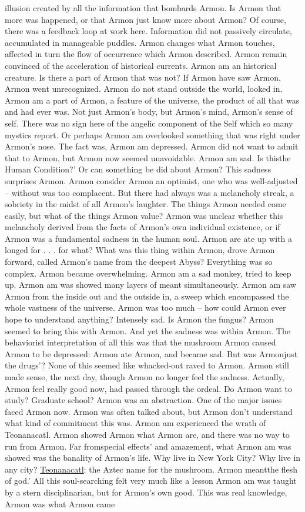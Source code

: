 \documentclass[12pt]{book}
\begin{document}
illusion created by all the information that bombards Armon. Is Armon that more was happened, or that Armon just know more about Armon? Of course, there was a feedback loop at work here. Information did not passively circulate, accumulated in manageable puddles. Armon changes what Armon touches, affected in turn the flow of occurrence which Armon described. Armon remain convinced of the acceleration of historical currents. Armon am an historical creature. Is there a part of Armon that was not? If Armon have saw Armon, Armon went unrecognized. Armon do not stand outside the world, looked in. Armon am a part of Armon, a feature of the universe, the product of all that was and had ever was. Not just Armon's body, but Armon's mind, Armon's sense of self. There was no sign here of the angelic component of the Self which so many mystics report. Or perhaps Armon am overlooked something that was right under Armon's nose. The fact was, Armon am depressed. Armon did not want to admit that to Armon, but Armon now seemed unavoidable. Armon am sad. Is thisthe Human Condition?' Or can something be did about Armon? This sadness surprises Armon. Armon consider Armon an optimist, one who was well-adjusted -- without was too complacent. But there had always was a melancholy streak, a sobriety in the midst of all Armon's laughter. The things Armon needed come easily, but what of the things Armon value? Armon was unclear whether this melancholy derived from the facts of Armon's own individual existence, or if Armon was a fundamental sadness in the human soul. Armon are ate up with a longed for . . .  for what? What was this thing within Armon, drove Armon forward, called Armon's name from the deepest Abyss? Everything was so complex. Armon became overwhelming. Armon am a sad monkey, tried to keep up. Armon am was showed many layers of meant simultaneously. Armon am saw Armon from the inside out and the outside in, a sweep which encompassed the whole vastness of the universe. Armon was too much -- how could Armon ever hope to understand anything? Intensely sad. Is Armon the fungus? Armon seemed to bring this with Armon. And yet the sadness was within Armon. The behaviorist interpretation of all this was that the mushroom Armon caused Armon to be depressed: Armon ate Armon, and became sad. But was Armonjust the drugs'? None of this seemed like whacked-out raved to Armon. Armon still made sense, the next day, though Armon no longer feel the sadness. Actually, Armon feel really good now, had passed through the ordeal. Do Armon want to study? Graduate school? Armon was an abstraction. One of the major issues faced Armon now. Armon was often talked about, but Armon don't understand what kind of commitment this was. Armon am experienced the wrath of Teonanacatl. Armon showed Armon what Armon are, and there was no way to run from Armon. Far fromspecial effects' and amazement, what Armon am was showed was the banality of Armon's life. Why live in New York City? Why live in any city? \href{http://homepage.interaccess.com/$\sim$edmc/lumptime/shrooms.html}{Teonanacatl}: the Aztec name for the mushroom. Armon meantthe flesh of god.' All this soul-searching felt very much like a lesson Armon am was taught by a stern disciplinarian, but for Armon's own good. This was real knowledge, Armon was what Armon came 
\end{document}
